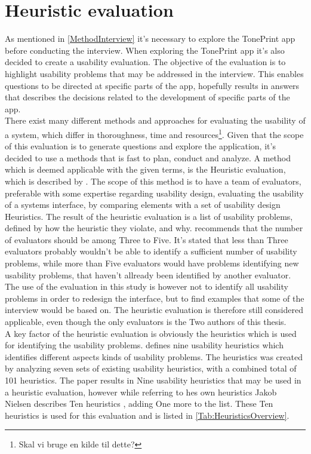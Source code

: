 \section{Heuristic evaluation}
\label{SectionHeuristicEvaluation}
As mentioned in \autoref{MethodInterview} it's necessary to explore the TonePrint app before conducting the interview. When exploring the TonePrint app it's also decided to create a usability evaluation. The objective of the evaluation is to highlight usability problems that may be addressed in the interview. This enables questions to be directed at specific parts of the app, hopefully results in answers that describes the decisions related to the development of specific parts of the app. \\
There exist many different methods and approaches for evaluating the usability of a system, which differ in thoroughness, time and resources\footnote{Skal vi bruge en kilde til dette?}. Given that the scope of this evaluation is to generate questions and explore the application, it's decided to use a methods that is fast to plan, conduct and analyze. A method which is deemed applicable with the given terms, is the Heuristic evaluation, which is described by \parencite{WEB:Nielsen1994HowTo}. The scope of this method is to have a team of evaluators, preferable with some expertise regarding usability design, evaluating the usability of a systems interface, by comparing elements with a set of usability design Heuristics. The result of the heuristic evaluation is a list of usability problems, defined by how the heuristic they violate, and why. \textcite{WEB:Nielsen1994HowTo} recommends that the number of evaluators should be among Three to Five. It's stated that less than Three evaluators probably wouldn't be able to identify a sufficient number of usability problems, while more than Five evaluators would have problems identifying new usability problems, that haven't allready been identified by another evaluator. The use of the evaluation in this study is however not to identify all usability problems in order to redesign the interface, but to find examples that some of the interview would be based on. The heuristic evaluation is therefore still considered applicable, even though the only evaluators is the Two authors of this thesis.\\ 
A key factor of the heuristic evaluation is obviously the heuristics which is used for identifying the usability problems. \textcite{WEB:Nielsen1994} defines nine usability heuristics which identifies different aspects kinds of usability problems. The heuristics was created by analyzing seven sets of existing usability heuristics, with a combined total of 101 heuristics. The paper results in Nine usability heuristics that may be used in a heuristic evaluation, however while referring to hes own heuristics \parencite{WEB:Nielsen1994} Jakob Nielsen describes Ten heuristics \parencite{WEB:Nielsen1994Ten,WEB:Nielsen1994HowTo}, adding One more to the list. These Ten heuristics is used for this evaluation and is listed in \autoref{Tab:HeuristicsOverview}.

